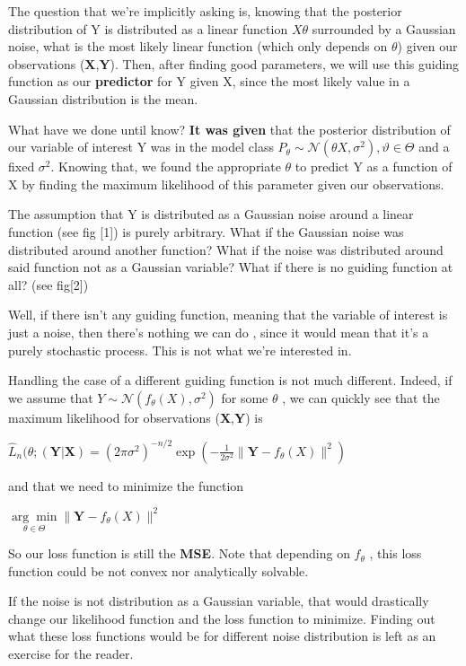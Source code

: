 The question that we're implicitly asking is, knowing that the posterior distribution of Y is distributed as a linear function $X\theta$ surrounded by a Gaussian noise, what is the most likely linear function (which only depends on $\theta$) given our observations (\textbf{X},\textbf{Y}). Then, after finding good parameters, we will use this guiding function as our \textbf{predictor} for Y given X, since the most likely value in a Gaussian distribution is the mean. 


What have we done until know? \textbf{It was given} that the posterior distribution of our variable of interest Y was in the model class $P_{\theta}\sim \mathcal{N}(\theta X,\sigma^{2}), \vartheta \in \Theta$ and a fixed $\sigma^{2}$. Knowing that, we found the appropriate $\theta$ to predict Y as a function of X by finding the maximum likelihood of this parameter given our observations.

The assumption that Y is distributed as a Gaussian noise around a linear function (see fig [1])  is purely arbitrary. What if the Gaussian noise was distributed around another function?  What if the noise was distributed around said function not as a Gaussian variable? What if there is no guiding function at all? (see fig[2])

Well, if there isn't any guiding function, meaning that the variable of interest is just a noise, then there's nothing we can do , since it would mean that it's a purely stochastic process. This is not what we're interested in.

Handling the case of a different guiding function is not much different. Indeed, if we assume that $Y \sim \mathcal{N}(f_{\theta}(X),\sigma^{2})$ for some $\theta$ , we can quickly see that the maximum likelihood for observations (\textbf{X},\textbf{Y}) is

$\widehat{L}_{n}(\theta ;(\mathbf{Y}|\mathbf{X})=\left(2 \pi \sigma^{2}\right)^{-n / 2} \exp \left(-\frac{1}{2 \sigma^{2}} \|\mathbf{Y}-f_{\theta}(X)\|^{2}\right)$ 

and that we need to minimize the function 

$\underset{\theta \in \Theta}{\arg \min }\|\mathbf{Y}-f_{\theta}(X)\|^{2}$

So our loss function is still the \textbf{MSE}. Note that depending on $f_{\theta}$ , this loss function could be not convex nor analytically solvable.

If the noise is not distribution as a Gaussian variable, that would drastically change our likelihood function and the loss function to minimize. Finding out what these loss functions would be for different noise distribution is left as an exercise for the reader.

